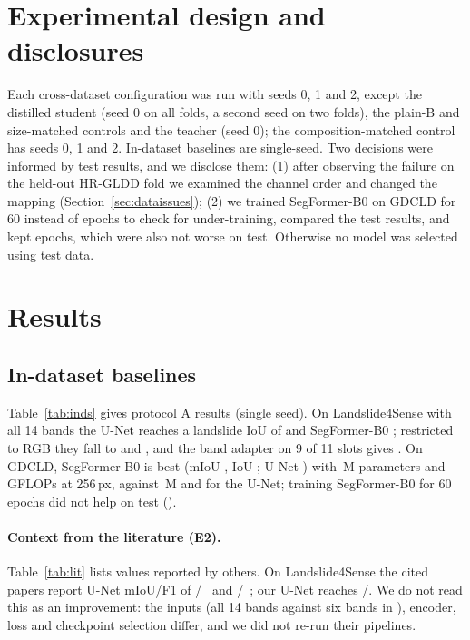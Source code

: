 \documentclass[11pt]{article}
\newcommand{\iou}{IoU}
\begin{document}
\section{Experimental design and disclosures}\label{sec:design}
Each cross-dataset configuration was run with seeds 0, 1 and 2, except the distilled student (seed 0 on all folds, a second seed on two folds), the plain-B and size-matched controls and the teacher (seed 0); the composition-matched control has seeds 0, 1 and 2. In-dataset baselines are single-seed. Two decisions were informed by test results, and we disclose them: (1) after observing the failure on the held-out HR-GLDD fold we examined the channel order and changed the mapping (Section~\ref{sec:dataissues}); (2) we trained SegFormer-B0 on GDCLD for 60 instead of \IndEpochsGdc{} epochs to check for under-training, compared the test results, and kept \IndEpochsGdc{} epochs, which were also not worse on test. Otherwise no model was selected using test data.

\section{Results}
\subsection{In-dataset baselines}\label{sec:inds}
Table~\ref{tab:inds} gives protocol A results (single seed). On Landslide4Sense with all 14 bands the U-Net reaches a landslide \iou{} of \InLfsFourteenUnetIou{} and SegFormer-B0 \InLfsFourteenSegIou{}; restricted to RGB they fall to \InLfsRgbUnetIou{} and \InLfsRgbSegIou{}, and the band adapter on 9 of 11 slots gives \InLfsBankAdpIou{}. On GDCLD, SegFormer-B0 is best (mIoU \InGdcRgbSegMiou{}, \iou{} \InGdcRgbSegIou{}; U-Net \InGdcRgbUnetIou{}) with \ParSeg{}\,M parameters and \GflSegPxTwoFiveSix{} GFLOPs at 256\,px, against \ParUnet{}\,M and \GflUnetPxTwoFiveSix{} for the U-Net; training SegFormer-B0 for 60 epochs did not help on test (\InGdcRgbSixtySegIou{}).

\begin{table}[t]\centering\scriptsize
\resizebox{\textwidth}{!}{}
\caption{In-dataset results (protocol A, official test sets, single seed). Landslide4Sense test masks are those shipped in the Zenodo release. All numbers measured by us.}\label{tab:inds}
\end{table}

\paragraph{Context from the literature (E2).} Table~\ref{tab:lit} lists values reported by others. On Landslide4Sense the cited papers report U-Net mIoU/F1 of \LitPrithviSevenUNetMiou{}/\LitPrithviSevenUNetFone{}~\cite{szwarcman2024prithvi} and \LitLiUNetMiou{}/\LitLiUNetFone{}~\cite{li2025prithvi}; our U-Net reaches \InLfsFourteenUnetMiou{}/\InLfsFourteenUnetFone{}. We do not read this as an improvement: the inputs (all 14 bands against six bands in \cite{szwarcman2024prithvi}), encoder, loss and checkpoint selection differ, and we did not re-run their pipelines.
\end{document}

